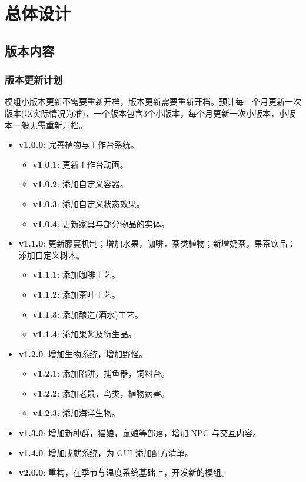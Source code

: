 \section{总体设计}

\subsection{版本内容}
\subsubsection{版本更新计划}

模组小版本更新不需要重新开档，版本更新需要重新开档。预计每三个月更新一次版本(以实际情况为准)，一个版本包含3个小版本，每个月更新一次小版本，小版本一般无需重新开档。

\begin{itemize}
    \item \textbf{v1.0.0}: 完善植物与工作台系统。
    \begin{itemize}
        \item \textbf{v1.0.1}: 更新工作台动画。
        \item \textbf{v1.0.2}: 添加自定义容器。
        \item \textbf{v1.0.3}: 添加自定义状态效果。
        \item \textbf{v1.0.4}: 更新家具与部分物品的实体。
    \end{itemize}
    \item \textbf{v1.1.0}: 更新藤蔓机制；增加水果，咖啡，茶类植物；新增奶茶，果茶饮品；添加自定义树木。
    \begin{itemize}
        \item \textbf{v1.1.1}: 添加咖啡工艺。
        \item \textbf{v1.1.2}: 添加茶叶工艺。
        \item \textbf{v1.1.3}: 添加酿造(酒水)工艺。
        \item \textbf{v1.1.4}: 添加果酱及衍生品。
    \end{itemize}
    \item \textbf{v1.2.0}: 增加生物系统，增加野怪。
    \begin{itemize}
        \item \textbf{v1.2.1}: 添加陷阱，捕鱼器，饲料台。
        \item \textbf{v1.2.2}: 添加老鼠，鸟类，植物病害。
        \item \textbf{v1.2.3}: 添加海洋生物。
    \end{itemize}
    \item \textbf{v1.3.0}: 增加新种群，猫娘，鼠娘等部落，增加 NPC 与交互内容。
    \item \textbf{v1.4.0}: 增加成就系统，为 GUI 添加配方清单。
    \item \textbf{v2.0.0}: 重构，在季节与温度系统基础上，开发新的模组。
\end{itemize}

